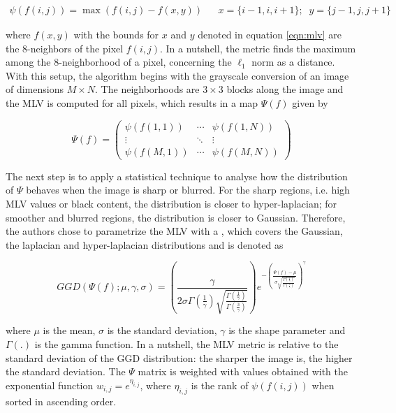 \begin{align}
\label{eqn:mlv}
\psi(f(i,j)) = \max(f(i,j) - f(x,y))
&&
x = \{i - 1, i, i + 1\};\;\;
y = \{j - 1, j, j + 1\}
\end{align}

\noindent where $f(x,y)$ with the bounds for $x$ and $y$ denoted in equation \ref{eqn:mlv} are the 8-neighbors of the pixel $f(i,j)$. In a nutshell, the metric finds the maximum among the 8-neighborhood of a pixel, concerning the $\ell_{1}$ norm as a distance. With this setup, the algorithm begins with the grayscale conversion of an image of dimensions $M \times N$. The neighborhoods are $3 \times 3$ blocks along the image and the MLV is computed for all pixels, which results in a map $\Psi(f)$ given by

\begin{equation}
\label{eqn:mlv_matrix}
\Psi(f) =
    \begin{pmatrix}
        \psi(f(1,1)) & \cdots &  \psi(f(1,N))\\
        \vdots & \ddots & \vdots\\
        \psi(f(M,1)) & \cdots & \psi(f(M,N))
    \end{pmatrix}
\end{equation}

\noindent The next step is to apply a statistical technique to analyse how the distribution of $\Psi$ behaves when the image is sharp or blurred. For the sharp regions, i.e. high MLV values or black content, the distribution is closer to hyper-laplacian; for smoother and blurred regions, the distribution is closer to Gaussian. Therefore, the authors chose to parametrize the MLV with a , which covers the Gaussian, the laplacian and hyper-laplacian distributions and is denoted as

\begin{equation}
\label{eqn:GGD_distribution}
GGD(\Psi(f); \mu, \gamma, \sigma) =
\left(
    \frac{\gamma}{2 \sigma \Gamma \left( \frac{1}{\gamma} \right) \sqrt{\frac{\Gamma \left( \frac{1}{\gamma} \right)}{\Gamma \left( \frac{3}{\gamma} \right)}}}
\right)
e^{- \left(
        \frac{\Psi(f) - \mu}{\sigma \sqrt{\frac{\Gamma \left( \frac{1}{\gamma} \right)}{\Gamma \left( \frac{3}{\gamma} \right)}}}
    \right)^{\gamma}}
\end{equation}

\noindent where $\mu$ is the mean, $\sigma$ is the standard deviation, $\gamma$ is the shape parameter and $\Gamma(.)$ is the gamma function. In a nutshell, the MLV metric is relative to the standard deviation of the GGD distribution: the sharper the image is, the higher the standard deviation. The $\Psi$ matrix is weighted with values obtained with the exponential function $w_{i,j} = e^{\eta_{i,j}}$, where $\eta_{i,j}$ is the rank of $\psi(f(i,j))$ when sorted in ascending order.